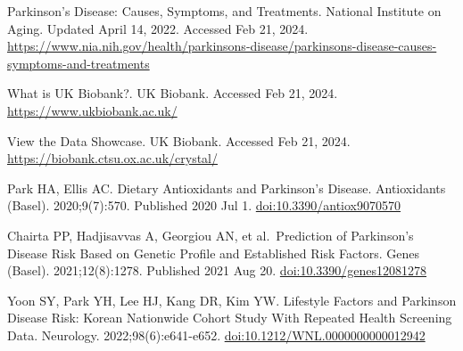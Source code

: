 \documentclass[12pt,]{article}
\begin{document}
Parkinson's Disease: Causes, Symptoms, and Treatments. National
Institute on Aging. Updated April 14, 2022. Accessed Feb 21, 2024.
\url{https://www.nia.nih.gov/health/parkinsons-disease/parkinsons-disease-causes-symptoms-and-treatments}

What is UK Biobank?. UK Biobank. Accessed Feb 21, 2024.
\url{https://www.ukbiobank.ac.uk/}

View the Data Showcase. UK Biobank. Accessed Feb 21, 2024.
\url{https://biobank.ctsu.ox.ac.uk/crystal/}

Park HA, Ellis AC. Dietary Antioxidants and Parkinson's Disease.
Antioxidants (Basel). 2020;9(7):570. Published 2020 Jul 1.
\url{doi:10.3390/antiox9070570}

Chairta PP, Hadjisavvas A, Georgiou AN, et al.~Prediction of Parkinson's
Disease Risk Based on Genetic Profile and Established Risk Factors.
Genes (Basel). 2021;12(8):1278. Published 2021 Aug 20.
\url{doi:10.3390/genes12081278}

Yoon SY, Park YH, Lee HJ, Kang DR, Kim YW. Lifestyle Factors and
Parkinson Disease Risk: Korean Nationwide Cohort Study With Repeated
Health Screening Data. Neurology. 2022;98(6):e641-e652.
\url{doi:10.1212/WNL.0000000000012942}


\end{document}
